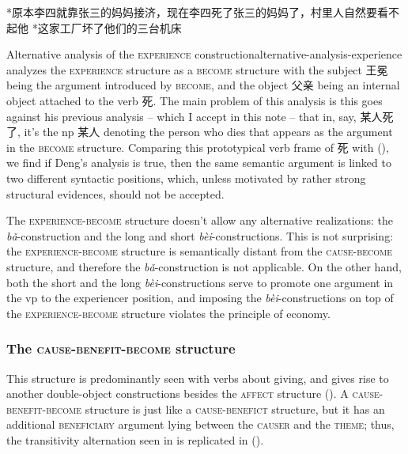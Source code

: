 \documentclass[UTF8, a4paper, oneside, scheme=plain, 12pt]{ctexrep}
\newcommand*{\citesec}[1]{\S~{#1}}
\newcommand{\form}[1]{\emph{#1}}
\newcommand*{\category}[1]{\textsc{#1}}
\begin{document}
\begin{exe}
    \ex\label{ex:verb-phrase.experience.3} *原本李四就靠张三的妈妈接济，现在李四死了张三的妈妈了，村里人自然要看不起他
    \ex\label{ex:verb-phrase.experience-4} *这家工厂坏了他们的三台机床
\end{exe}

\begin{infobox}{Alternative analysis of the \category{experience} construction}{alternative-analysis-experience}
    \citet[\citesec{212}]{deng2010formal} analyzes the \category{experience} structure 
    as a \category{become} structure with 
    the subject 王冕 being the argument introduced by \category{become},
    and the object 父亲 being an internal object attached to the verb 死.
    The main problem of this analysis is 
    this goes against his previous analysis -- 
    which I accept in this note -- 
    that in, say, 某人死了, it's the \acs{np} 某人 denoting the person who dies that 
    appears as the argument in the \category{become} structure.
    Comparing this prototypical verb frame of 死 
    with (),
    we find if Deng's analysis is true,
    then the same semantic argument is linked to two different syntactic positions,
    which, unless motivated by rather strong structural evidences, 
    should not be accepted.
\end{infobox}

The \category{experience}-\category{become} structure 
doesn't allow any alternative realizations:
the \form{bǎ}-construction and the long and short \form{bèi}-constructions.
This is not surprising:
the \category{experience}-\category{become} structure 
is semantically distant from the \category{cause}-\category{become} structure,
and therefore the \form{bǎ}-construction 
is not applicable.
On the other hand,
both the short and the long \form{bèi}-constructions 
serve to promote one argument in the \acs{vp} 
to the experiencer position,
and imposing the \form{bèi}-constructions 
on top of the \category{experience}-\category{become} structure
violates the principle of economy.

\subsubsection{The \category{cause}-\category{benefit}-\category{become} structure}\label{sec:verb-phrase.dative}

This structure is predominantly seen with verbs about giving,
and gives rise to another double-object constructions 
besides the \category{affect} structure
().
A \category{cause}-\category{benefit}-\category{become} structure
is just like a \category{cause}-\category{benefict} structure,
but it has an additional \category{beneficiary} argument 
lying between the \category{causer} and the \category{theme};
thus, the transitivity alternation seen in 
is replicated in 
().
\end{document}
